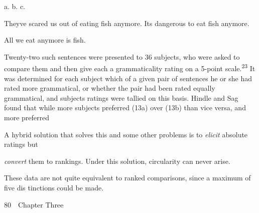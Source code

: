 \begin{multicols}{2}
\setcounter{listWWNumxlviiileveli}{8}
\begin{listWWNumxlviiileveli}
\item 
\begin{styleStandard}
a. b. c.
\end{styleStandard}


\end{listWWNumxlviiileveli}
\begin{styleTextbody}
They{\textquotesingle}ve scared us out of eating fish anymore. It{\textquotesingle}s dangerous to eat fish anymore.
\end{styleTextbody}


\begin{styleTextbody}
All we eat anymore is fish.
\end{styleTextbody}


\end{multicols}
\begin{styleTextbody}
Twenty-two such sentences were presented to 36 subjects, who were asked to compare them and then give each a grammaticality rating on a 5-point scale.\textsuperscript{23}\textsuperscript{ }It was determined for each subject which of a given pair of sentences he or she had rated more grammatical, or whether the pair had been rated equally grammatical, and subjects{\textquotesingle} ratings were tallied on this basis. Hindle and Sag found that while more subjects preferred (13a) over (13b) than vice versa, and more preferred
\end{styleTextbody}


\setcounter{listWWNumxlviileveli}{20}
\begin{listWWNumxlviileveli}
\item 
\begin{styleStandard}
A hybrid solution that solves this and some other problems is to \textit{elicit}\textit{ }absolute ratings but
\end{styleStandard}


\end{listWWNumxlviileveli}
\begin{styleStandard}
\textit{convert}\textit{ }them to rankings. Under this solution, circularity can never arise.
\end{styleStandard}


\begin{listWWNumxlviileveli}
\item 
\begin{styleStandard}
These data are not quite equivalent to ranked comparisons, since a maximum of five dis\- tinctions could be made.
\end{styleStandard}


\end{listWWNumxlviileveli}
\clearpage\setcounter{page}{1}\begin{styleStandard}
80\ \ Chapter Three
\end{styleStandard}


